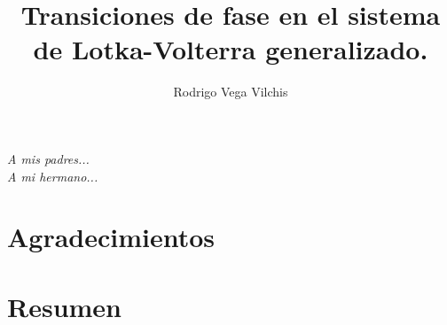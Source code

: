 \documentclass[a4paper,11pt]{book}
\author{Rodrigo Vega Vilchis}
\title{Transiciones de fase en el sistema de Lotka-Volterra generalizado.}
\theoremstyle{plain}
\theoremstyle{definition}
\begin{document}
\frontmatter
\maketitle

\begin{flushright}%
	\emph{A mis padres...}\\
	\emph{A mi hermano...}
	\thispagestyle{empty}
\end{flushright}

\chapter{Agradecimientos}

\chapter{Resumen}

\tableofcontents
\listoffigures
\listoftables
\listofalgorithms


%

\mainmatter
%

%




\backmatter
\printbibliography
\appendix
%
\end{document}
